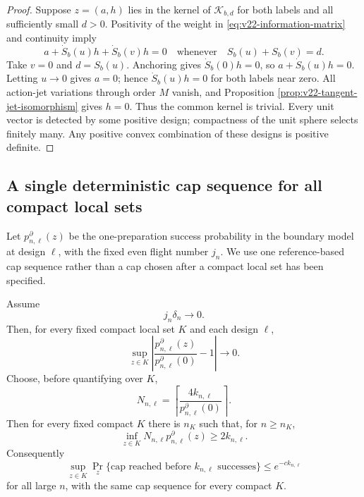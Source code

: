 \begin{proof}
Suppose $z=(a,h)$ lies in the kernel of $\mathcal K_{b,d}$ for both labels and
all sufficiently small $d>0$.  Positivity of the weight in
\eqref{eq:v22-information-matrix} and continuity imply
\[
 a+\dot S_b(u)h+\dot S_b(v)h=0
 \quad\text{whenever}\quad S_b(u)+S_b(v)=d.
\]
Take $v=0$ and $d=S_b(u)$.  Anchoring gives
$\dot S_b(0)h=0$, so $a+\dot S_b(u)h=0$.  Letting $u\to0$ gives $a=0$;
hence $\dot S_b(u)h=0$ for both labels near zero.  All action-jet variations
through order $M$ vanish, and Proposition
\ref{prop:v22-tangent-jet-isomorphism} gives $h=0$.  Thus the common kernel is
trivial.  Every unit vector is detected by some positive design; compactness
of the unit sphere selects finitely many.  Any positive convex combination of
these designs is positive definite.
\end{proof}

\subsection{A single deterministic cap sequence for all compact local sets}

Let $p^\partial_{n,\ell}(z)$ be the one-preparation success probability in
the boundary model at design $\ell$, with the fixed even flight number $j_n$.
We use one reference-based cap sequence rather than a cap chosen after a
compact local set has been specified.

\begin{lemma}
\label{lem:v22-reference-cap}
Assume
\begin{equation}\label{eq:v22-slow-hyperbolic-variation}
                         j_n\delta_n\longrightarrow0.
\end{equation}
Then, for every fixed compact local set $K$ and each design $\ell$,
\begin{equation}\label{eq:v22-success-ratio}
 \sup_{z\in K}
 \left|\frac{p^\partial_{n,\ell}(z)}
              {p^\partial_{n,\ell}(0)}-1\right|\longrightarrow0.
\end{equation}
Choose, before quantifying over $K$,
\begin{equation}\label{eq:v22-cap-choice}
 N_{n,\ell}=
 \left\lceil\frac{4k_{n,\ell}}{p^\partial_{n,\ell}(0)}\right\rceil.
\end{equation}
Then for every fixed compact $K$ there is $n_K$ such that, for
$n\ge n_K$,
\begin{equation}\label{eq:v22-cap-uniform}
 \inf_{z\in K}N_{n,\ell}p^\partial_{n,\ell}(z)
 \ge2k_{n,\ell}.
\end{equation}
Consequently
\begin{equation}\label{eq:v22-cap-tail}
 \sup_{z\in K}\Pr_z\{\text{cap reached before }k_{n,\ell}
 \text{ successes}\}\le e^{-c k_{n,\ell}}
\end{equation}
for all large $n$, with the same cap sequence for every compact $K$.
\end{lemma}

